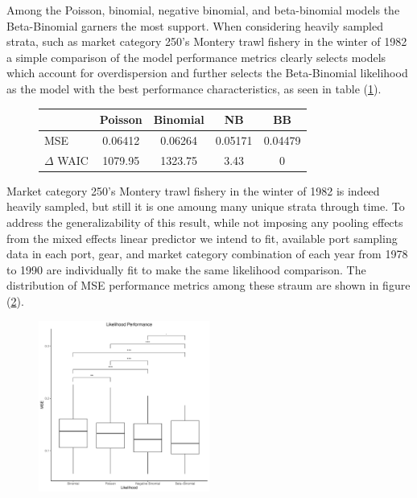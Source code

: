 \documentclass[12pt]{article}
\begin{document}
Among the Poisson, binomial, negative binomial, and beta-binomial models the 
Beta-Binomial garners the most support. When considering heavily sampled 
strata, such as market category 250's Montery trawl fishery in the winter of 
1982 a simple comparison of the model performance metrics clearly selects 
models which account for overdispersion and further selects the Beta-Binomial 
likelihood as the model with the best performance characteristics, as seen in 
table (\ref{likeTab}). 

%
\begin{figure}[h!]
\centering
\begin{tabular}[c]{@{}lcccc@{}}
\hline
& Poisson & Binomial & NB & BB \\ \hline
MSE & 0.06412 & 0.06264 & 0.05171 & 0.04479 \\
\(\Delta\) WAIC & 1079.95 & 1323.75 & 3.43 & 0 \\ \hline
\end{tabular}
\label{likeTab}
\end{figure}

Market category 250's Montery trawl fishery in the winter of 1982 is indeed 
heavily sampled, but still it is one amoung many unique strata through 
time. To address the generalizability of this result, while not imposing any 
pooling effects from the mixed effects linear predictor we intend to fit, 
available port sampling data in each port, gear, and market category 
combination of each year from 1978 to 1990 are individually fit to make the 
same likelihood comparison. The distribution of MSE performance metrics among 
these straum are shown in figure (\ref{mseBox}).  

%
\begin{figure}[h!]
\centering
\includegraphics[width=0.5\textwidth]{./pictures/mseBoxP.pdf}
\label{mseBox}
\end{figure}
\end{document}
